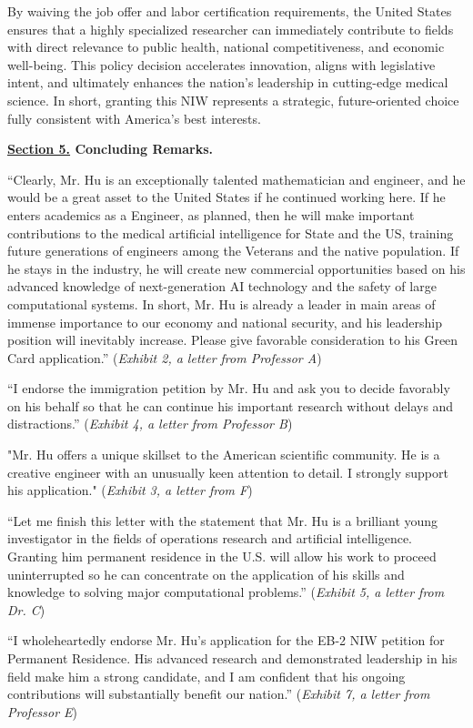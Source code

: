 \documentclass{article}
\begin{document}
By waiving the job offer and labor certification requirements, the United States ensures that a highly specialized researcher can immediately contribute to fields with direct relevance to public health, national competitiveness, and economic well-being. This policy decision accelerates innovation, aligns with legislative intent, and ultimately enhances the nation’s leadership in cutting-edge medical science. In short, granting this NIW represents a strategic, future-oriented choice fully consistent with America’s best interests.

\clearpage

{\bf \underline{Section 5.} Concluding Remarks. }

“Clearly, Mr. Hu is an exceptionally talented mathematician and engineer, and he would be a great asset to the United States if he continued working here. If he enters academics as a Engineer, as planned, then he will make important contributions to the medical artificial intelligence for State and the US, training future generations of engineers among the Veterans and the native population. If he stays in the industry, he will create new commercial opportunities based on his advanced knowledge of next-generation AI technology and the safety of large computational systems. In short, Mr. Hu is already a leader in main areas of immense importance to our economy and national security, and his leadership position will inevitably increase. Please give favorable consideration to his Green Card application.” ({\it Exhibit 2, a letter from Professor A}) 

“I endorse the immigration petition by Mr. Hu and ask you to decide favorably on his behalf so that he can continue his important research without delays and distractions.” ({\it Exhibit 4, a letter from Professor B}) 

"Mr. Hu offers a unique skillset to the American scientific community. He is a creative engineer with an unusually keen attention to detail. I strongly support his application." ({\it Exhibit 3, a letter from F}) 

“Let me finish this letter with the statement that Mr. Hu is a brilliant young investigator in the fields of operations research and artificial intelligence. Granting him permanent residence in the U.S. will allow his work to proceed uninterrupted so he can concentrate on the application of his skills and knowledge to solving major computational problems.” ({\it Exhibit 5, a letter from Dr. C}) 

“I wholeheartedly endorse Mr. Hu's application for the EB-2 NIW petition for Permanent Residence. His advanced research and demonstrated leadership in his field make him a strong candidate, and I am confident that his ongoing contributions will substantially benefit our nation.” ({\it Exhibit 7, a letter from Professor E}) 
\end{document}
